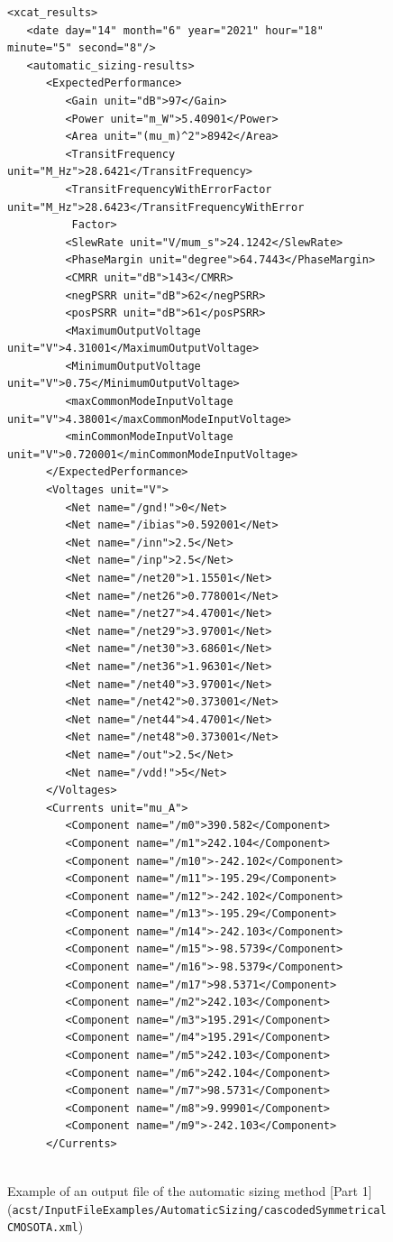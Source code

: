\begin{figure}[H]
	\begin{lstlisting}[basicstyle=\ttfamily\scriptsize,backgroundcolor={\color{gray!30}}, escapechar=? ]
<xcat_results>
   <date day="14" month="6" year="2021" hour="18" minute="5" second="8"/>
   <automatic_sizing-results>
      <ExpectedPerformance>
         <Gain unit="dB">97</Gain>
         <Power unit="m_W">5.40901</Power>
         <Area unit="(mu_m)^2">8942</Area>
         <TransitFrequency unit="M_Hz">28.6421</TransitFrequency>
         <TransitFrequencyWithErrorFactor unit="M_Hz">28.6423</TransitFrequencyWithError
          Factor>
         <SlewRate unit="V/mum_s">24.1242</SlewRate>
         <PhaseMargin unit="degree">64.7443</PhaseMargin>
         <CMRR unit="dB">143</CMRR>
         <negPSRR unit="dB">62</negPSRR>
         <posPSRR unit="dB">61</posPSRR>
         <MaximumOutputVoltage unit="V">4.31001</MaximumOutputVoltage>
         <MinimumOutputVoltage unit="V">0.75</MinimumOutputVoltage>
         <maxCommonModeInputVoltage unit="V">4.38001</maxCommonModeInputVoltage>
         <minCommonModeInputVoltage unit="V">0.720001</minCommonModeInputVoltage>
      </ExpectedPerformance>
      <Voltages unit="V">
         <Net name="/gnd!">0</Net>
         <Net name="/ibias">0.592001</Net>
         <Net name="/inn">2.5</Net>
         <Net name="/inp">2.5</Net>
         <Net name="/net20">1.15501</Net>
         <Net name="/net26">0.778001</Net>
         <Net name="/net27">4.47001</Net>
         <Net name="/net29">3.97001</Net>
         <Net name="/net30">3.68601</Net>
         <Net name="/net36">1.96301</Net>
         <Net name="/net40">3.97001</Net>
         <Net name="/net42">0.373001</Net>
         <Net name="/net44">4.47001</Net>
         <Net name="/net48">0.373001</Net>
         <Net name="/out">2.5</Net>
         <Net name="/vdd!">5</Net>
      </Voltages>
      <Currents unit="mu_A">
         <Component name="/m0">390.582</Component>
         <Component name="/m1">242.104</Component>
         <Component name="/m10">-242.102</Component>
         <Component name="/m11">-195.29</Component>
         <Component name="/m12">-242.102</Component>
         <Component name="/m13">-195.29</Component>
         <Component name="/m14">-242.103</Component>
         <Component name="/m15">-98.5739</Component>
         <Component name="/m16">-98.5379</Component>
         <Component name="/m17">98.5371</Component>
         <Component name="/m2">242.103</Component>
         <Component name="/m3">195.291</Component>
         <Component name="/m4">195.291</Component>
         <Component name="/m5">242.103</Component>
         <Component name="/m6">242.104</Component>
         <Component name="/m7">98.5731</Component>
         <Component name="/m8">9.99901</Component>
         <Component name="/m9">-242.103</Component>
      </Currents>


	\end{lstlisting}
	\caption{Example of an output file of the  automatic sizing method [Part 1] ({\tt acst/\protect \linebreak InputFileExamples/AutomaticSizing/cascodedSymmetricalCMOSOTA.xml})}
\end{figure}


